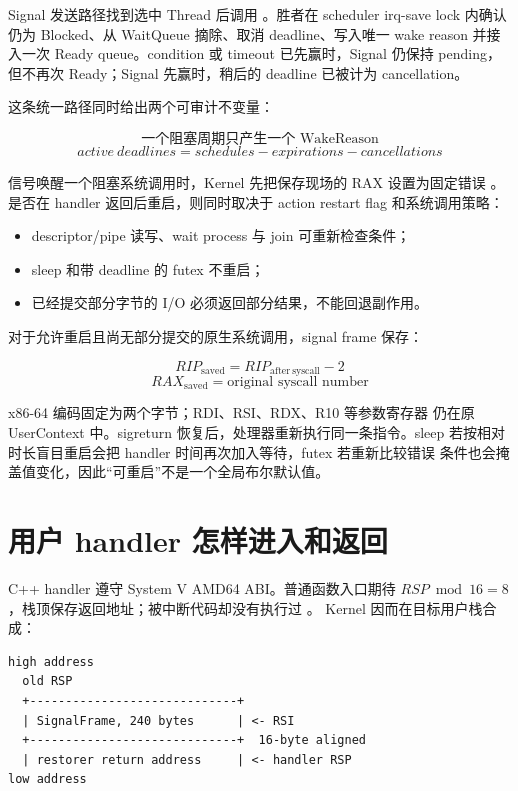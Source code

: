Signal 发送路径找到选中 Thread 后调用
。胜者在 scheduler irq-save lock
内确认仍为 Blocked、从 WaitQueue 摘除、取消 deadline、写入唯一 wake reason
并接入一次 Ready queue。condition 或 timeout 已先赢时，Signal 仍保持
pending，但不再次 Ready；Signal 先赢时，稍后的 deadline 已被计为 cancellation。

这条统一路径同时给出两个可审计不变量：

\[
  \text{一个阻塞周期只产生一个 WakeReason}
\]
\[
  active\ deadlines=schedules-expirations-cancellations
\]

信号唤醒一个阻塞系统调用时，Kernel 先把保存现场的 RAX 设置为固定错误
。是否在 handler 返回后重启，则同时取决于 action restart flag
和系统调用策略：

\begin{itemize}
  \item descriptor/pipe 读写、wait process 与 join 可重新检查条件；
  \item sleep 和带 deadline 的 futex 不重启；
  \item 已经提交部分字节的 I/O 必须返回部分结果，不能回退副作用。
\end{itemize}

对于允许重启且尚无部分提交的原生系统调用，signal frame 保存：

\[
  RIP_{\mathrm{saved}}=RIP_{\mathrm{after\ syscall}}-2
\]
\[
  RAX_{\mathrm{saved}}=\text{original syscall number}
\]

x86-64  编码固定为两个字节；RDI、RSI、RDX、R10 等参数寄存器
仍在原 UserContext 中。sigreturn 恢复后，处理器重新执行同一条指令。sleep
若按相对时长盲目重启会把 handler 时间再次加入等待，futex 若重新比较错误
条件也会掩盖值变化，因此“可重启”不是一个全局布尔默认值。

\section{用户 handler 怎样进入和返回}
C++ handler 遵守 System V AMD64 ABI。普通函数入口期待
\(RSP\bmod16=8\)，栈顶保存返回地址；被中断代码却没有执行过 。
Kernel 因而在目标用户栈合成：

\begin{lstlisting}
high address
  old RSP
  +-----------------------------+
  | SignalFrame, 240 bytes      | <- RSI
  +-----------------------------+  16-byte aligned
  | restorer return address     | <- handler RSP
low address
\end{lstlisting}

